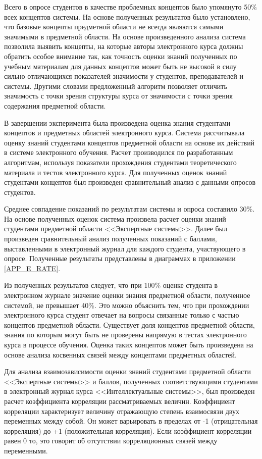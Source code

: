 Всего в опросе студентов в качестве проблемных концептов было упомянуто 50\% всех концептов системы. На основе полученных результатов было установлено, что базовые концепты предметной области не всегда являются самыми значимыми в предметной области. На основе произведенного анализа система позволила выявить концепты, на которые авторы электронного курса должны обратить особое внимание так, как точность оценки знаний полученных по учебным материалам для данных концептов может быть не высокой в силу сильно отличающихся показателей значимости у студентов, преподавателей и системы. Другими словами предложенный алгоритм позволяет отличить значимость с точки зрения структуры курса от значимости с точки зрения содержания предметной области.

В завершении эксперимента была произведена оценка знания студентами концептов и предметных областей электронного курса. Система рассчитывала оценку знаний студентами концептов предметной области на основе их действий в системе электронного обучения. Расчет производился по разработанным алгоритмам, используя показатели прохождения студентами теоретического материала и тестов электронного курса. Для полученных оценок знаний студентами концептов был произведен сравнительный анализ с данными опросов студентов. 

Среднее совпадение показаний по результатам системы и опроса составило 30\%. На основе полученных оценок система произвела расчет оценки знаний студентами предметной области <<Экспертные системы>>. Далее был произведен сравнительный анализ полученных показаний с баллами, выставленными в электронный журнал для каждого студента, участвующего в опросе. Полученные результаты представлены в диаграммах в приложении \ref{APP_E_RATE}. 

Из полученных результатов следует, что при 100\% оценке студента в электронном журнале значение оценки знания предметной области, полученное системой, не превышает 40\%. Это можно объяснить тем, что при прохождении электронного курса студент отвечает на вопросы связанные только с частью концептов предметной области. Существует доля концептов предметной области, знания по которым могут быть не проверены напрямую в тестах электронного курса в процессе обучения. Оценка таких концептов может быть произведена на основе анализа косвенных связей между концептами предметных областей.

Для анализа взаимозависимости оценки знаний студентами предметной области  <<Экспертные системы>> и баллов, полученных соответствующими студентами в электронный журнал курса <<Интеллектуальные системы>>, был произведен расчет коэффициента корреляции рассматриваемых величин. Коэффициент корреляции характеризует величину отражающую степень взаимосвязи двух переменных между собой. Он может варьировать в пределах от -1 (отрицательная корреляция) до +1 (положительная корреляция). Если коэффициент корреляции равен 0 то, это говорит об отсутствии корреляционных связей между переменными. 

